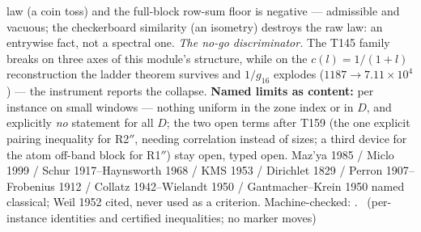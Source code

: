 law (a coin toss) and the full-block row-sum floor is negative ---
admissible and vacuous; the checkerboard similarity (an isometry)
destroys the raw law: an entrywise fact, not a spectral one.
\emph{The no-go discriminator.} The T145 family breaks on three axes of
this module's structure, while on the $c(l)=1/(1+l)$ reconstruction the
ladder theorem survives and $1/g_{16}$ explodes
($1187\to7.11\times10^{4}$) --- the instrument reports the collapse.
\textbf{Named limits as content:} per instance on small windows ---
nothing uniform in the zone index or in $D$, and explicitly \emph{no}
statement for all $D$; the two open terms after T159 (the one explicit
pairing inequality for R2$''$, needing correlation instead of sizes; a
third device for the atom off-band block for R1$''$) stay open, typed
open.
Maz'ya 1985 / Miclo 1999 / Schur 1917--Haynsworth 1968 / KMS 1953 /
Dirichlet 1829 / Perron 1907--Frobenius 1912 / Collatz 1942--Wielandt
1950 / Gantmacher--Krein 1950 named classical; Weil 1952 cited, never
used as a criterion.
Machine-checked:
.
\mE\ (per-instance identities and certified inequalities; no marker moves)


